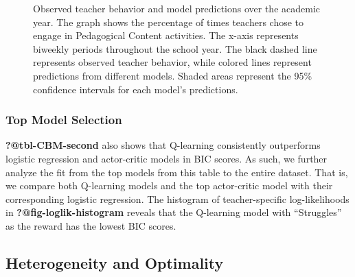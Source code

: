 \documentclass[
  number,
  preprint,
  3p,
  onecolumn]{elsarticle}
\begin{document}
\begin{figure}


\caption{\label{fig-action-percentages-2}Observed teacher behavior and
model predictions over the academic year. The graph shows the percentage
of times teachers chose to engage in Pedagogical Content activities. The
x-axis represents biweekly periods throughout the school year. The black
dashed line represents observed teacher behavior, while colored lines
represent predictions from different models. Shaded areas represent the
95\% confidence intervals for each model's predictions.}

\end{figure}%

\subsubsection{Top Model Selection}\label{top-model-selection}

\textbf{?@tbl-CBM-second} also shows that Q-learning consistently
outperforms logistic regression and actor-critic models in BIC scores.
As such, we further analyze the fit from the top models from this table
to the entire dataset. That is, we compare both Q-learning models and
the top actor-critic model with their corresponding logistic regression.
The histogram of teacher-specific log-likelihoods in
\textbf{?@fig-loglik-histogram} reveals that the Q-learning model with
``Struggles'' as the reward has the lowest BIC scores.

\subsection{Heterogeneity and
Optimality}\label{heterogeneity-and-optimality}
\end{document}
